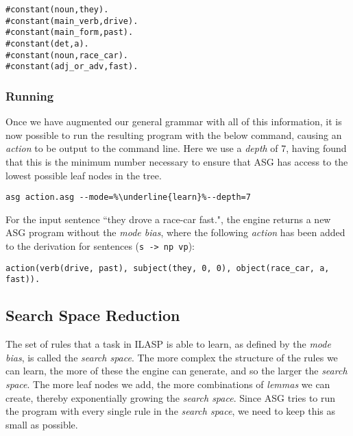 \begin{displayquote}
\begin{lstlisting}
#constant(noun,they).
#constant(main_verb,drive).
#constant(main_form,past).
#constant(det,a).
#constant(noun,race_car).
#constant(adj_or_adv,fast).
\end{lstlisting}
\end{displayquote}

\subsubsection{Running}

Once we have augmented our general grammar with all of this information, it is now possible to run the resulting program with the below command, causing an \textit{action} to be output to the command line. Here we use a \textit{depth} of 7, having found that this is the minimum number necessary to ensure that ASG has access to the lowest possible leaf nodes in the tree.

\begin{displayquote}
\begin{lstlisting}[numbers=none, escapechar=\%]
asg action.asg --mode=%\underline{learn}%--depth=7
\end{lstlisting}
\end{displayquote}

For the input sentence ``they drove a race-car fast.", the engine returns a new ASG program without the \textit{mode bias}, where the following \textit{action} has been added to the derivation for sentences (\texttt{s -> np vp}):

\begin{displayquote}
\begin{lstlisting}[numbers=none]
action(verb(drive, past), subject(they, 0, 0), object(race_car, a, fast)).
\end{lstlisting}
\end{displayquote}

\subsection{Search Space Reduction}

The set of rules that a task in ILASP is able to learn, as defined by the \textit{mode bias}, is called the \textit{search space}. The more complex the structure of the rules we can learn, the more of these the engine can generate, and so the larger the \textit{search space}. The more leaf nodes we add, the more combinations of \textit{lemmas} we can create, thereby exponentially growing the \textit{search space}. Since ASG tries to run the program with every single rule in the \textit{search space}, we need to keep this as small as possible.

